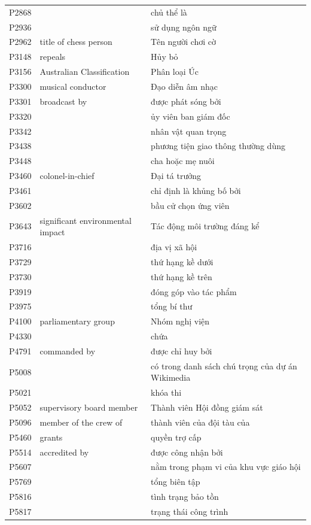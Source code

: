 \begin{center}
\begin{longtable}{p{1.6cm} p{5.2cm} p{5.2cm}}
P2868 &  & chủ thể là \\
P2936 &  & sử dụng ngôn ngữ \\
P2962 & title of chess person & Tên người chơi cờ \\
P3148 & repeals & Hủy bỏ \\
P3156 & Australian Classification & Phân loại Úc \\
P3300 & musical conductor & Đạo diễn âm nhạc \\
P3301 & broadcast by & được phát sóng bởi \\
P3320 &  & ủy viên ban giám đốc \\
P3342 &  & nhân vật quan trọng \\
P3438 &  & phương tiện giao thông thường dùng \\
P3448 &  & cha hoặc mẹ nuôi \\
P3460 & colonel-in-chief & Đại tá trưởng \\
P3461 &  & chỉ định là khủng bố bởi \\
P3602 &  & bầu cử chọn ứng viên \\
P3643 & significant environmental impact & Tác động môi trường đáng kể \\
P3716 &  & địa vị xã hội \\
P3729 &  & thứ hạng kề dưới \\
P3730 &  & thứ hạng kề trên \\
P3919 &  & đóng góp vào tác phẩm \\
P3975 &  & tổng bí thư \\
P4100 & parliamentary group & Nhóm nghị viện \\
P4330 &  & chứa \\
P4791 & commanded by & được chỉ huy bởi \\
P5008 &  & có trong danh sách chú trọng của dự án Wikimedia \\
P5021 &  & khóa thi \\
P5052 & supervisory board member & Thành viên Hội đồng giám sát \\
P5096 & member of the crew of & thành viên của đội tàu của \\
P5460 & grants & quyền trợ cấp \\
P5514 & accredited by & được công nhận bởi \\
P5607 &  & nằm trong phạm vi của khu vực giáo hội \\
P5769 &  & tổng biên tập \\
P5816 &  & tình trạng bảo tồn \\
P5817 &  & trạng thái công trình \\

\end{longtable}
\end{center}
